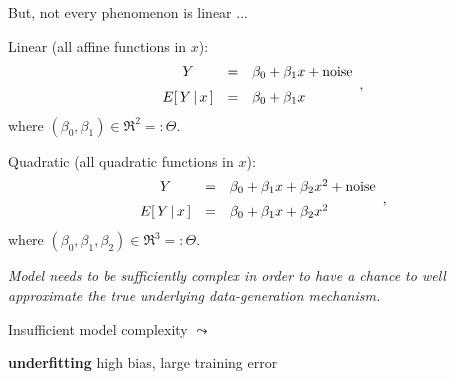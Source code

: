 

\begin{frame}{\Large But, not every phenomenon is linear ...}

\scriptsize
\pause

\begin{multicols}{2}

	\begin{flushleft}
	\end{flushleft}

\columnbreak

	\begin{flushright}
	\begin{minipage}{5.0cm}

	\pause
	Linear (all affine functions in $x$):
	\vskip -0.5cm
	\begin{equation*}
	\begin{array}{ccl}
	Y & = & \beta_{0}  + \beta_{1} x + \textnormal{noise}
	\\
	\overset{{\color{white}1}}{E}\!\left[\,Y\,\vert\,x\,\right] & = & \beta_{0}  + \beta_{1} x
	\end{array},
	\end{equation*}
	\vskip -0.25cm
	where $(\beta_{0},\beta_{1})\in\Re^{2} =: \Theta$.

	\pause
	\vskip 0.3cm
	Quadratic  (all quadratic functions in $x$):
	\vskip -0.5cm
	\begin{equation*}
	\begin{array}{ccl}
	Y & = & \beta_{0}  + \beta_{1} x + \beta_{2}x^{2} + \textnormal{noise}
	\\
	\overset{{\color{white}1}}{E}\!\left[\,Y\,\vert\,x\,\right] & = & \beta_{0}  + \beta_{1} x + \beta_{2}x^{2}
	\end{array},
	\end{equation*}
	\vskip -0.25cm
	where $(\beta_{0},\beta_{1},\beta_{2})\in\Re^{3} =: \Theta$.

	\vskip 0.3cm
	\pause
	\textit{Model needs to be sufficiently complex in order to have a chance to well approximate the
	true underlying data-generation mechanism.}
	
	\end{minipage}
	\end{flushright}

\end{multicols}

\pause
\begin{center}
\large Insufficient model complexity \;\;$\leadsto$\;\;
\begin{minipage}{4.0cm} \begin{center} \textbf{\Large\color{red}underfitting} \vskip -0.1cm {\scriptsize high bias, large training error} \end{center} \end{minipage}
\end{center}

\end{frame}
\normalsize

